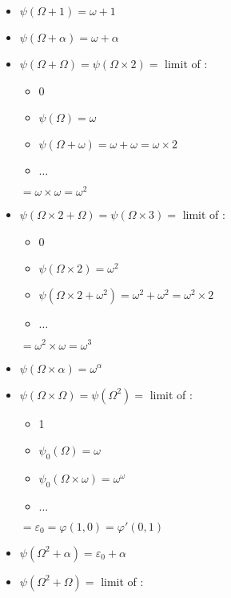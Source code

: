 \documentclass[10pt]{article}
\begin{document}
\begin{itemize}
     \setlength{\itemsep}{1pt}
     \setlength{\parskip}{0pt}
     \setlength{\parsep}{0pt}
\item \( \psi(\Omega+1) = \omega+1 \)
\item \( \psi(\Omega+\alpha) = \omega+\alpha \)
\item \( \psi(\Omega+\Omega) = \psi(\Omega \times 2) = \) limit of :
   \begin{itemize}
     \setlength{\itemsep}{1pt}
     \setlength{\parskip}{0pt}
     \setlength{\parsep}{0pt}
   \item 0
   \item \( \psi(\Omega)=\omega \)
   \item \( \psi(\Omega+\omega)=\omega+\omega=\omega \times 2 \)
   \item \( \ldots \)
   \end{itemize}
   \( = \omega \times \omega = \omega^2 \)
\item \( \psi(\Omega \times 2 + \Omega) = \psi(\Omega \times 3) = \) limit of :
   \begin{itemize}
     \setlength{\itemsep}{1pt}
     \setlength{\parskip}{0pt}
     \setlength{\parsep}{0pt}
   \item 0
   \item \( \psi(\Omega \times 2) = \omega^2 \)
   \item \( \psi(\Omega \times 2 + \omega^2) = \omega^2+\omega^2 = \omega^2 \times 2 \)
   \item \( \ldots \)
   \end{itemize}
   \( = \omega^2 \times \omega = \omega^3 \)
\item \( \psi(\Omega \times \alpha) = \omega^\alpha \)
\item \( \psi(\Omega \times \Omega) = \psi(\Omega^2) = \) limit of :
   \begin{itemize}
     \setlength{\itemsep}{1pt}
     \setlength{\parskip}{0pt}
     \setlength{\parsep}{0pt}
   \item 1
   \item \( \psi_0(\Omega) = \omega \)
   \item \( \psi_0(\Omega \times \omega) = \omega^\omega \)
   \item \( \ldots \)
   \end{itemize}
   \( = \varepsilon_0 = \varphi(1,0) = \varphi'(0,1) \)
\item \( \psi(\Omega^2+\alpha) = \varepsilon_0+\alpha \)
\item \( \psi(\Omega^2+\Omega) = \) limit of :

\end{itemize}
\end{document}
